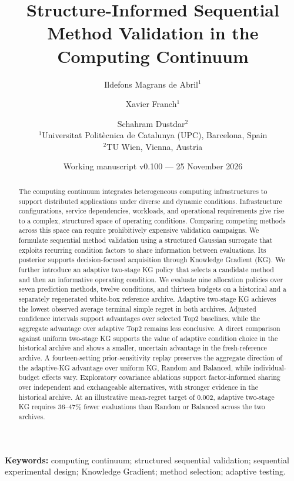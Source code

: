\documentclass[10pt,a4paper]{article}
\title{\bfseries Structure-Informed Sequential Method Validation in the Computing Continuum}
\author{Ildefons Magrans de Abril$^{1}$ \and Xavier Franch$^{1}$ \and Schahram Dustdar$^{2}$\\[6pt]
\small $^{1}$Universitat Polit\`ecnica de Catalunya (UPC), Barcelona, Spain\\
\small $^{2}$TU Wien, Vienna, Austria}
\date{Working manuscript v0.100 --- 25 November 2026}
\begin{document}
\maketitle
\begin{abstract}
The computing continuum integrates heterogeneous computing infrastructures to support distributed applications under diverse and dynamic conditions. Infrastructure configurations, service dependencies, workloads, and operational requirements give rise to a complex, structured space of operating conditions. Comparing competing methods across this space can require prohibitively expensive validation campaigns. We formulate sequential method validation using a structured Gaussian surrogate that exploits recurring condition factors to share information between evaluations. Its posterior supports decision-focused acquisition through Knowledge Gradient (KG). We further introduce an adaptive two-stage KG policy that selects a candidate method and then an informative operating condition. We evaluate nine allocation policies over seven prediction methods, twelve conditions, and thirteen budgets on a historical and a separately regenerated white-box reference archive. Adaptive two-stage KG achieves the lowest observed average terminal simple regret in both archives. Adjusted confidence intervals support advantages over selected Top2 baselines, while the aggregate advantage over adaptive Top2 remains less conclusive. A direct comparison against uniform two-stage KG supports the value of adaptive condition choice in the historical archive and shows a smaller, uncertain advantage in the fresh-reference archive. A fourteen-setting prior-sensitivity replay preserves the aggregate direction of the adaptive-KG advantage over uniform KG, Random and Balanced, while individual-budget effects vary. Exploratory covariance ablations support factor-informed sharing over independent and exchangeable alternatives, with stronger evidence in the historical archive. At an illustrative mean-regret target of 0.002, adaptive two-stage KG requires 36--47\% fewer evaluations than Random or Balanced across the two archives.
\end{abstract}

\noindent\textbf{Keywords:} computing continuum; structured sequential validation; sequential experimental design; Knowledge Gradient; method selection; adaptive testing.
\end{document}
